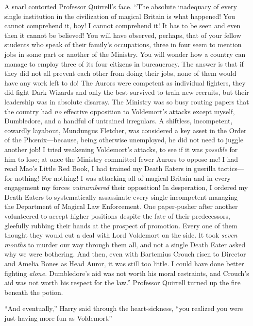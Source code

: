 A snarl contorted Professor Quirrell’s face. “The absolute inadequacy of every single institution in the civilization of magical Britain is what happened! You cannot comprehend it, boy! I cannot comprehend it! It has to be seen and even then it cannot be believed! You will have observed, perhaps, that of your fellow students who speak of their family’s occupations, three in four seem to mention jobs in some part or another of the Ministry. You will wonder how a country can manage to employ three of its four citizens in bureaucracy. The answer is that if they did not all prevent each other from doing their jobs, none of them would have any work left to do! The Aurors were competent as individual fighters, they did fight Dark Wizards and only the best survived to train new recruits, but their leadership was in absolute disarray. The Ministry was so busy routing papers that the country had \emph{no} effective opposition to Voldemort’s attacks except myself, Dumbledore, and a handful of untrained irregulars. A shiftless, incompetent, cowardly layabout, Mundungus Fletcher, was considered a key asset in the Order of the Phœnix—because, being otherwise unemployed, he did not need to juggle another job! I tried weakening Voldemort’s attacks, to see if it was \emph{possible} for him to lose; at once the Ministry committed fewer Aurors to oppose me! I had read Mao’s Little Red Book, I had trained my Death Eaters in guerilla tactics—for nothing! For nothing! I was attacking all of magical Britain and in every engagement my forces \emph{outnumbered} their opposition! In desperation, I ordered my Death Eaters to systematically assassinate every single incompetent managing the Department of Magical Law Enforcement. One paper-pusher after another volunteered to accept higher positions despite the fate of their predecessors, gleefully rubbing their hands at the prospect of promotion. Every one of them thought they would cut a deal with Lord Voldemort on the side. It took \emph{seven months} to murder our way through them all, and not a single Death Eater asked why we were bothering. And then, even with Bartemius Crouch risen to Director and Amelia Bones as Head Auror, it was still too little. I could have done better fighting \emph{alone.} Dumbledore’s aid was not worth his moral restraints, and Crouch’s aid was not worth his respect for the law.” Professor Quirrell turned up the fire beneath the potion.

“And eventually,” Harry said through the heart-sickness, “you realized you were just having more fun as Voldemort.”


